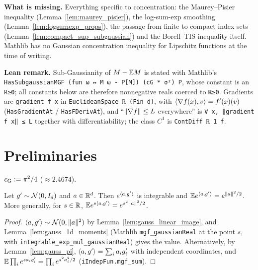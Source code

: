 \textbf{What is missing.} Everything specific to concentration: the Maurey--Pisier inequality
(Lemma~\ref{lem:maurey_pisier}), the log-sum-exp smoothing (Lemma~\ref{lem:logsumexp_props}),
the passage from finite to compact index sets (Lemma~\ref{lem:compact_sup_subgaussian}) and
the Borell--TIS inequality itself. Mathlib has no Gaussian concentration inequality for
Lipschitz functions at the time of writing.

\textbf{Lean remark.} Sub-Gaussianity of $M - \mathbb{E} M$ is stated with Mathlib's
\texttt{HasSubgaussianMGF (fun ω ↦ M ω - P[M]) (cG * σ²) P}, whose constant is an
\texttt{ℝ≥0}; all constants below are therefore nonnegative reals coerced to \texttt{ℝ≥0}.
Gradients are \texttt{gradient f x} in \texttt{EuclideanSpace ℝ (Fin d)}, with
$\langle \nabla f(x), v \rangle = f'(x)(v)$ (\texttt{HasGradientAt} / \texttt{HasFDerivAt}), and
``$\lVert \nabla f \rVert \le L$ everywhere'' is \texttt{∀ x, ‖gradient f x‖ ≤ L} together with
differentiability; the class $C^1$ is \texttt{ContDiff ℝ 1 f}.

\section{Preliminaries}
\label{sec:pre_concentration_prelim}

\begin{definition}\label{def:pc_gaussian_constant}
\leanok
$c_{\mathrm{G}} := \pi^2/4$ ($\approx 2.4674$).
\end{definition}

\begin{lemma}\label{lem:gauss_mgf_inner}
\leanok
{}
Let $g' \sim \mathcal{N}(0, I_d)$ and $a \in \mathbb{R}^d$. Then $e^{\langle a, g' \rangle}$ is integrable and
$\mathbb{E} e^{\langle a, g' \rangle} = e^{\lVert a \rVert^2/2}$. More generally, for $s \in \mathbb{R}$,
$\mathbb{E} e^{s\langle a, g' \rangle} = e^{s^2\lVert a \rVert^2/2}$.
\end{lemma}

\begin{proof}
\leanok
{}
$\langle a, g' \rangle \sim \mathcal{N}(0,\lVert a \rVert^2)$ by Lemma~\ref{lem:gauss_linear_image}, and
Lemma~\ref{lem:gauss_1d_moments} (Mathlib \texttt{mgf\_gaussianReal} at the point $s$, with
\texttt{integrable\_exp\_mul\_gaussianReal}) gives the value. Alternatively, by
Lemma~\ref{lem:gauss_pi}, $\langle a, g' \rangle = \sum_ia_ig'_i$ with independent coordinates, and
$\mathbb{E}\prod_ie^{sa_ig'_i} = \prod_ie^{s^2a_i^2/2}$ (\texttt{iIndepFun.mgf\_sum}).
\end{proof}

